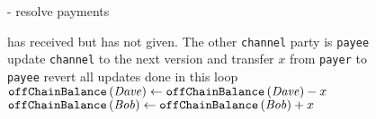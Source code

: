 \begin{figure}[H]
\begin{systembox}{\fpaynet - resolve payments}
\begin{algorithmic}[1]
                has received but has not given. The other \texttt{channel} party
                is \texttt{payee}
                  \State update \texttt{channel} to the next version and
                  transfer $x$ from \texttt{payer} to \texttt{payee}
                  \label{alg:fpaynet:resolvepay:update}
                \Else
                  \State revert all updates done in this loop
                \EndIf
              \EndFor
                \State $\mathtt{offChainBalance}\left(\mathit{Dave}\right) \gets
                \mathtt{offChainBalance}\left(\mathit{Dave}\right) - x$
              \EndIf
              \State $\mathtt{offChainBalance}\left(\mathit{Bob}\right) \gets
              \mathtt{offChainBalance}\left(\mathit{Bob}\right) + x$
            \EndFor
          \EndFor
        \EndIndent
      \end{algorithmic}
    \end{systembox}
    \caption{}
    \label{alg:fpaynet:resolvepay}
  \end{figure}


